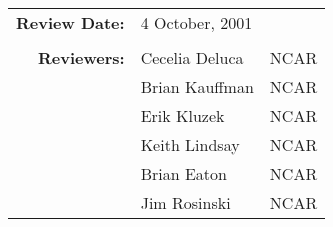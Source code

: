 \documentclass[]{article}
\begin{document}
 \\

\begin{tabular}{r p{1.3in} p{2in}} 
{\bf Review Date:} & 4 October, 2001     \\ \\
{\bf Reviewers:}   & Cecelia Deluca     & NCAR \\ 
                   & Brian Kauffman     & NCAR \\ 
                   & Erik Kluzek        & NCAR \\ 
                   & Keith Lindsay      & NCAR \\ 
                   & Brian Eaton        & NCAR \\ 
                   & Jim Rosinski       & NCAR
\end{tabular}
\end{document}
